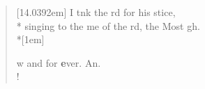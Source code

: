 \begin{flushleft}
\begin{verse}[14.0392em]
 I tnk the rd for his stice,\\*
singing to the me of the rd, the Most gh.\\*[1em]

w and for \textbf{e}ver. An.\\!
\end{verse}
\end{flushleft}
